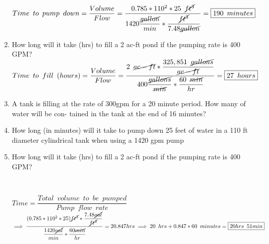 \documentclass{article}
\begin{document}
\begin{enumerate}
 $Time \enspace to \enspace pump \enspace down= \dfrac{Volume}{Flow}=\dfrac{0.785*110^2*25 \enspace \cancel{ft^3}}{1420\dfrac{\cancel{gallon}}{min}*\dfrac{\cancel{ft^3}}{7.48\cancel{gallon}}}=\boxed{190 \enspace minutes}$
 

\item How long will it take (hrs) to fill a 2 ac-ft pond if the pumping rate is 400 GPM?\\
$Time \enspace to \enspace fill \enspace(hours)= \dfrac{Volume}{Flow}=\dfrac{2 \enspace \cancel{ac-ft}*\dfrac{325,851 \enspace \cancel{gallons}}{\cancel{ac-ft}}}{400 \dfrac{\cancel{gallons}}{\cancel{min}}*\dfrac{60 \enspace\cancel{ min}}{hr}}=\boxed{27 \enspace hours}$
\item A tank is filling at the rate of 300gpm for a 20 minute period. How many of water will be con- tained in the tank at the end of 16 minutes?

\item How long (in minutes) will it take to pump down 25 feet of water in a 110 ft diameter cylindrical tank when using a 1420 gpm pump\\

\item How long will it take (hrs) to fill a 2 ac-ft pond if the pumping rate is 400 GPM?

\begin{center}
\\
\end{center}
$Time=\dfrac{Total \enspace volume \enspace to \enspace be \enspace pumped}{Pump \enspace flow \enspace rate}$\\
\vspace{0.3cm}
$\implies \dfrac{(0.785*110^2*25)\cancel{ft^3}*\dfrac{7.48\cancel{gal}}{\cancel{ft^3}}}{\dfrac{1420\cancel{gal}}{min}*\dfrac{60\cancel{min}}{hr}}=20.847hrs \implies 20 \enspace hrs + 0.847*60 \enspace minutes = \boxed{20hrs \enspace 51 min}$




\end{enumerate}
\end{document}
